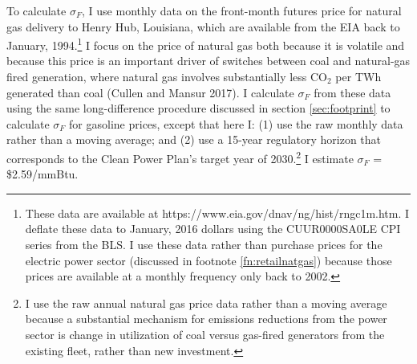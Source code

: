 \documentclass[12pt]{article}
\begin{document}
To calculate $\sigma_F$, I use monthly data on the front-month futures price for natural gas delivery to Henry Hub, Louisiana, which are available from the EIA back to January, 1994.\footnote{These data are available at https://www.eia.gov/dnav/ng/hist/rngc1m.htm. I deflate these data to January, 2016 dollars using the CUUR0000SA0LE CPI series from the BLS. I use these data rather than purchase prices for the electric power sector (discussed in footnote \ref{fn:retailnatgas}) because those prices are available at a monthly frequency only back to 2002.} I focus on the price of natural gas both because it is volatile and because this price is an important driver of switches between coal and natural-gas fired generation, where natural gas involves substantially less CO$_2$ per TWh generated than coal (Cullen and Mansur 2017). I calculate $\sigma_F$ from these data using the same long-difference procedure discussed in section \ref{sec:footprint} to calculate $\sigma_F$ for gasoline prices, except that here I: (1) use the raw monthly data rather than a moving average; and (2) use a 15-year regulatory horizon that corresponds to the Clean Power Plan's target year of 2030.\footnote{I use the raw annual natural gas price data rather than a moving average because a substantial mechanism for emissions reductions from the power sector is change in utilization of coal versus gas-fired generators from the existing fleet, rather than new investment.} I estimate $\sigma_F$ = \$2.59/mmBtu.
\end{document}
